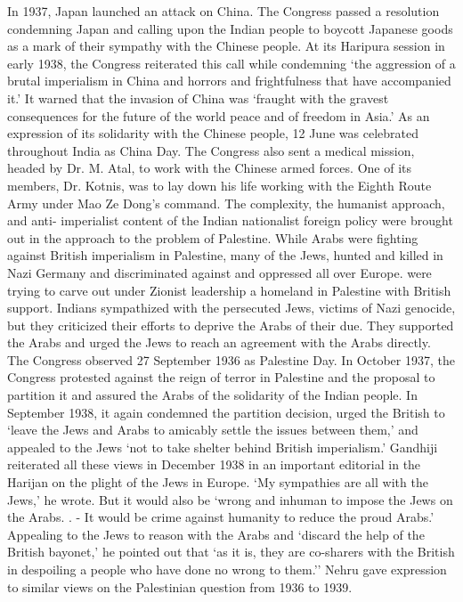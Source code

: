 In 1937, Japan launched an attack on China. The Congress passed a resolution condemning Japan and calling upon the Indian people to boycott Japanese goods as a mark of their sympathy with the Chinese people. At its Haripura session in early 1938, the Congress reiterated this call while condemning `the aggression of a brutal imperialism in China and horrors and frightfulness that have accompanied it.' It warned that the invasion of China was `fraught with the gravest consequences for the future of the world peace and of freedom in Asia.' As an expression of its solidarity with the Chinese people, 12 June was celebrated throughout India as China Day. The Congress also sent a medical mission, headed by Dr. M. Atal, to work with the Chinese armed forces. One of its members, Dr. Kotnis, was to lay down his life working with the Eighth Route Army under Mao Ze­ Dong's command. The complexity, the humanist approach, and anti- imperialist content of the Indian nationalist foreign policy were brought out in the approach to the problem of Palestine. While Arabs were fighting against British imperialism in Palestine, many of the Jews, hunted and killed in Nazi Germany and discriminated against and oppressed all over Europe. were trying to carve out under Zionist leadership a homeland in Palestine with British support. Indians sympathized with the persecuted Jews, victims of Nazi genocide, but they criticized their efforts to deprive the Arabs of their due. They supported the Arabs and urged the Jews to reach an agreement with the Arabs directly. The Congress observed 27 September 1936 as Palestine Day. In October 1937, the Congress protested against the reign of terror in Palestine and the proposal to partition it and assured the Arabs of the solidarity of the Indian people. In September 1938, it again condemned the partition decision, urged the British to `leave the Jews and Arabs to amicably settle the issues between them,' and appealed to the Jews `not to take shelter behind British imperialism.' Gandhiji reiterated all these views in December 1938 in an important editorial in the Harijan on the plight of the Jews in Europe. `My sympathies are all with the Jews,' he wrote. But it would also be `wrong and inhuman to impose the Jews on the Arabs. . - It would be crime against humanity to reduce the proud Arabs.' Appealing to the Jews to reason with the Arabs and `discard the help of the British bayonet,' he pointed out that `as it is, they are co-sharers with the British in despoiling a people who have done no wrong to them.'' Nehru gave expression to similar views on the Palestinian question from 1936 to 1939. 

